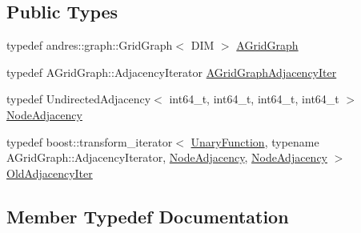 \subsection*{Public Types}
\begin{DoxyCompactItemize}
\item 
typedef andres\+::graph\+::\+Grid\+Graph$<$ D\+I\+M $>$ \hyperlink{classnifty_1_1graph_1_1detail__graph_1_1UndirectedGridGraphIter_a562bd40c2ea973c15b828062247ddd1f}{A\+Grid\+Graph}
\item 
typedef A\+Grid\+Graph\+::\+Adjacency\+Iterator \hyperlink{classnifty_1_1graph_1_1detail__graph_1_1UndirectedGridGraphIter_a824924927d819949af2370aa628af595}{A\+Grid\+Graph\+Adjacency\+Iter}
\item 
typedef Undirected\+Adjacency$<$ int64\+\_\+t, int64\+\_\+t, int64\+\_\+t, int64\+\_\+t $>$ \hyperlink{classnifty_1_1graph_1_1detail__graph_1_1UndirectedGridGraphIter_ab102d464df39aae71f7482baa37d8966}{Node\+Adjacency}
\item 
typedef boost\+::transform\+\_\+iterator$<$ \hyperlink{structnifty_1_1graph_1_1detail__graph_1_1UndirectedGridGraphIter_1_1UnaryFunction}{Unary\+Function}, typename A\+Grid\+Graph\+::\+Adjacency\+Iterator, \hyperlink{classnifty_1_1graph_1_1detail__graph_1_1UndirectedGridGraphIter_ab102d464df39aae71f7482baa37d8966}{Node\+Adjacency}, \hyperlink{classnifty_1_1graph_1_1detail__graph_1_1UndirectedGridGraphIter_ab102d464df39aae71f7482baa37d8966}{Node\+Adjacency} $>$ \hyperlink{classnifty_1_1graph_1_1detail__graph_1_1UndirectedGridGraphIter_a0b2569d896d215175b54ed1f439ad5a5}{Old\+Adjacency\+Iter}
\end{DoxyCompactItemize}


\subsection{Member Typedef Documentation}
\hypertarget{classnifty_1_1graph_1_1detail__graph_1_1UndirectedGridGraphIter_a562bd40c2ea973c15b828062247ddd1f}{}
